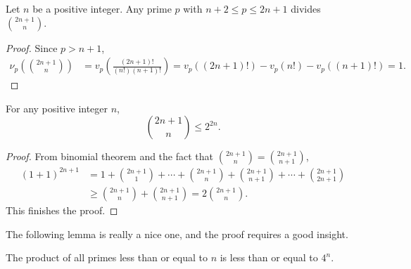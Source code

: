 \documentclass{subfile}
\begin{document}
	\begin{lemma}\label{lem:bertrand4}
		Let $n$ be a positive integer. Any prime $p$ with $n+2\leq p\leq 2n+1$ divides $\binom{2n+1}{n}$.
	\end{lemma}
	
	\begin{proof}
		Since $p>n+1$,
		\begin{align*}
			\nu_p\left(\binom{2n+1}{n}\right)  & =  v_p \left(\frac{(2n+1)!}{(n!)(n+1)!}\right) = v_p((2n+1)!)-v_p(n!)-v_p((n+1)!)=1.
		\end{align*}
	\end{proof}
	
	\begin{lemma}\label{lem:bertrand5}
		For any positive integer $n$,
		\[\binom{2n+1}{n}\leq2^{2n}.\]
	\end{lemma}
	
	\begin{proof}
		From binomial theorem and the fact that $\binom{2n+1}{n}=\binom{2n+1}{n+1}$,
		\begin{align*}
			(1+1)^{2n+1}  & =     1+\binom{2n+1}1+\cdots+\binom{2n+1}{n}+\binom{2n+1}{n+1}+\cdots+\binom{2n+1}{2n+1}\\
			& \geq  \binom{2n+1}{n}+\binom{2n+1}{n+1} =  2\binom{2n+1}{n}.
		\end{align*}
		This finishes the proof.
	\end{proof}
	
	The following lemma is really a nice one, and the proof requires a good insight.
	
	\begin{lemma}\label{lem:bertrand6}
		The product of all primes less than or equal to $n$ is less than or equal to $4^n$.
	\end{lemma}
	
\end{document}
